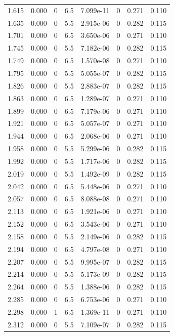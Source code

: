 \documentclass[preview]{standalone}
\begin{document}
{{{\begin{tabular}{L{1.2cm}C{1.2cm} C{0.3cm}C{0.5cm} C{1.4cm}C{1.4cm} C{1.4cm}C{1.4cm}}
  1.615  &  0.000  & 0     & 6.5 &  7.099e-11  & 0  & 0.271 &  0.110   \\ 
  1.635  &  0.000  & 0     & 5.5 &  2.915e-06  & 0  & 0.282 &  0.115   \\ 
  1.701  &  0.000  & 0     & 6.5 &  3.650e-06  & 0  & 0.271 &  0.110   \\ 
  1.745  &  0.000  & 0     & 5.5 &  7.182e-06  & 0  & 0.282 &  0.115   \\ 
  1.749  &  0.000  & 0     & 6.5 &  1.570e-08  & 0  & 0.271 &  0.110   \\ 
  1.795  &  0.000  & 0     & 5.5 &  5.055e-07  & 0  & 0.282 &  0.115   \\ 
  1.826  &  0.000  & 0     & 5.5 &  2.883e-07  & 0  & 0.282 &  0.115   \\ 
  1.863  &  0.000  & 0     & 6.5 &  1.289e-07  & 0  & 0.271 &  0.110   \\ 
  1.899  &  0.000  & 0     & 6.5 &  7.179e-06  & 0  & 0.271 &  0.110   \\ 
  1.921  &  0.000  & 0     & 6.5 &  5.057e-07  & 0  & 0.271 &  0.110   \\ 
  1.944  &  0.000  & 0     & 6.5 &  2.068e-06  & 0  & 0.271 &  0.110   \\ 
  1.958  &  0.000  & 0     & 5.5 &  5.299e-06  & 0  & 0.282 &  0.115   \\ 
  1.992  &  0.000  & 0     & 5.5 &  1.717e-06  & 0  & 0.282 &  0.115   \\ 
  2.019  &  0.000  & 0     & 5.5 &  1.492e-09  & 0  & 0.282 &  0.115   \\ 
  2.042  &  0.000  & 0     & 6.5 &  5.448e-06  & 0  & 0.271 &  0.110   \\ 
  2.057  &  0.000  & 0     & 6.5 &  8.088e-08  & 0  & 0.271 &  0.110   \\ 
  2.113  &  0.000  & 0     & 6.5 &  1.921e-06  & 0  & 0.271 &  0.110   \\ 
  2.152  &  0.000  & 0     & 6.5 &  3.543e-06  & 0  & 0.271 &  0.110   \\ 
  2.158  &  0.000  & 0     & 5.5 &  2.149e-06  & 0  & 0.282 &  0.115   \\ 
  2.194  &  0.000  & 0     & 6.5 &  4.797e-08  & 0  & 0.271 &  0.110   \\ 
  2.207  &  0.000  & 0     & 5.5 &  9.995e-07  & 0  & 0.282 &  0.115   \\ 
  2.214  &  0.000  & 0     & 5.5 &  5.173e-09  & 0  & 0.282 &  0.115   \\ 
  2.264  &  0.000  & 0     & 5.5 &  1.388e-06  & 0  & 0.282 &  0.115   \\ 
  2.285  &  0.000  & 0     & 6.5 &  6.753e-06  & 0  & 0.271 &  0.110   \\ 
  2.298  &  0.000  & 1     & 6.5 &  1.369e-11  & 0  & 0.271 &  0.110   \\ 
  2.312  &  0.000  & 0     & 5.5 &  7.109e-07  & 0  & 0.282 &  0.115   \\ 
\hline 
\end{tabular} 

}}}
\end{document}
